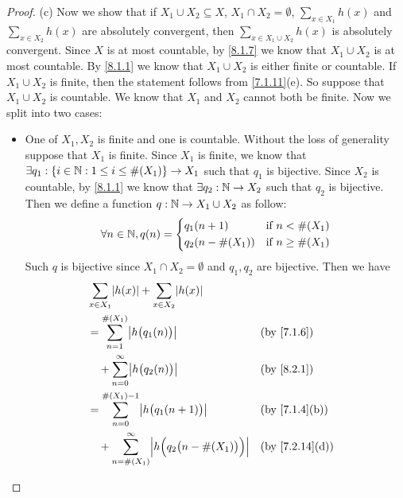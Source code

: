 \begin{proof}{(c)}
  Now we show that if \(X_1 \cup X_2 \subseteq X\), \(X_1 \cap X_2 = \emptyset\), \(\sum_{x \in X_1} h(x)\) and \(\sum_{x \in X_2} h(x)\) are absolutely convergent, then \(\sum_{x \in X_1 \cup X_2} h(x)\) is absolutely convergent.
  Since \(X\) is at most countable, by \cref{8.1.7} we know that \(X_1 \cup X_2\) is at most countable.
  By \cref{8.1.1} we know that \(X_1 \cup X_2\) is either finite or countable.
  If \(X_1 \cup X_2\) is finite, then the statement follows from \cref{7.1.11}(e).
  So suppose that \(X_1 \cup X_2\) is countable.
  We know that \(X_1\) and \(X_2\) cannot both be finite.
  Now we split into two cases:
  \begin{itemize}
    \item One of \(X_1, X_2\) is finite and one is countable.
          Without the loss of generality suppose that \(X_1\) is finite.
          Since \(X_1\) is finite, we know that \(\exists q_1 : \left\lbrace i \in \mathbb{N} : 1 \leq i \leq \#(X_1)\right\rbrace \to X_1\) such that \(q_1\) is bijective.
          Since \(X_2\) is countable, by \cref{8.1.1} we know that \(\exists q_2 : \mathbb{N} \to X_2\) such that \(q_2\) is bijective.
          Then we define a function \(q : \mathbb{N} \to X_1 \cup X_2\) as follow:
          \[
            \forall n \in \mathbb{N}, q(n) = \begin{dcases}
              q_1(n + 1)       & \text{if } n < \#(X_1)    \\
              q_2(n - \#(X_1)) & \text{if } n \geq \#(X_1)
            \end{dcases}
          \]
          Such \(q\) is bijective since \(X_1 \cap X_2 = \emptyset\) and \(q_1, q_2\) are bijective.
          Then we have
          \begin{align*}
             & \sum_{x \in X_1} \abs{h(x)} + \sum_{x \in X_2} \abs{h(x)}                                                                              \\
             & = \sum_{n = 1}^{\#(X_1)} \abs{h\big(q_1(n)\big)}                                                     &  & \by{7.1.6}                   \\
             & \quad + \sum_{n = 0}^\infty \abs{h\big(q_2(n)\big)}                                                  &  & \by{8.2.1}                   \\
             & = \sum_{n = 0}^{\#(X_1) - 1} \abs{h\big(q_1(n + 1)\big)}                                             &  & \text{(by \cref{7.1.4}(b))}  \\
             & \quad + \sum_{n = \#(X_1)}^\infty \abs{h\Big(q_2\big(n - \#(X_1)\big)\Big)}                          &  & \text{(by \cref{7.2.14}(d))} \\

\end{align*}
\end{itemize}
\end{proof}
